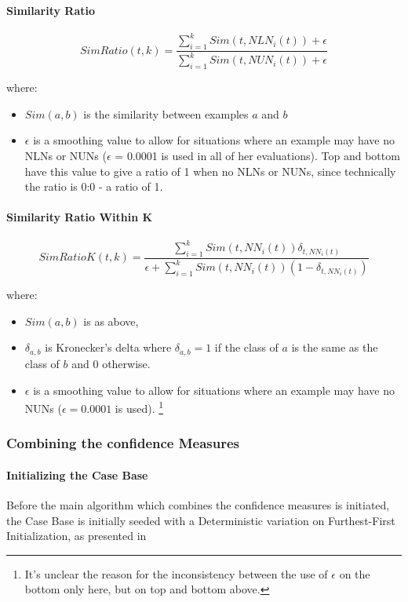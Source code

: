 \documentclass[a4paper,11pt]{report}
\begin{document}
\paragraph{Similarity Ratio}
\[
SimRatio(t,k)=\frac{\sum_{i=1}^{k}Sim(t,NLN_{i}(t))+\epsilon}{\sum_{i=1}^{k}Sim(t,NUN_{i}(t))+\epsilon}
\]

where:
\begin{itemize}
	\item $Sim(a, b)$ is the similarity between examples $a$ and $b$ 
	\item $\epsilon$ is a smoothing value to allow for situations where an example may have no NLNs or NUNs ($\epsilon$ = 0.0001 is used in all of her evaluations). Top and bottom have this value to give a ratio of 1 when no NLNs or NUNs, since technically the ratio is 0:0 - a ratio of 1.
\end{itemize}

\paragraph{Similarity Ratio Within K}
\[
SimRatioK(t,k)=\frac{\sum_{i=1}^{k}Sim(t,NN_{i}(t))\delta_{t,NN_{i}(t)}}{\epsilon+\sum_{i=1}^{k}Sim(t,NN_{i}(t))(1-\delta_{t,NN_{i}(t)})}
\]

where:
\begin{itemize}
	\item $Sim(a, b)$ is as above, 
	\item $\delta_{a, b}$ is Kronecker's delta where $\delta_{a, b}=1$ if the class of $a$ is the same as the class of $b$ and $0$ otherwise. 
	\item $\epsilon$ is a smoothing value to allow for situations where an example may have no NUNs ($\epsilon = 0.0001$ is used). \footnote{It's unclear the reason for the inconsistency between the use of $\epsilon$ on the bottom only here, but on top and bottom above.}
\end{itemize}


\subsubsection{Combining the confidence Measures}
\paragraph{Initializing the Case Base}
Before the main algorithm which combines the confidence measures is initiated, the Case Base is initially seeded with a Deterministic variation on Furthest-First Initialization, as presented in \citet{Greene2007}
\end{document}

